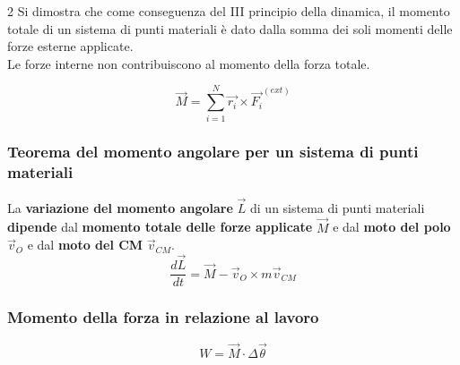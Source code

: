 \documentclass[twoside]{article}
\begin{document}
\begin{multicols}{2}
  \noindent
  Si dimostra che come conseguenza del III principio della dinamica, il momento totale di un sistema di punti materiali è dato dalla somma dei soli momenti delle forze esterne applicate.
  \columnbreak
  \noindent
  \\
  Le forze interne non contribuiscono al momento della forza totale.
\end{multicols}
\begin{equation*}
  \vec{M} = \sum_{i=1}^{N} \vec{r_i} \times \vec{F_i}^{(ext)}
\end{equation*}

\subsubsection{Teorema del momento angolare per un sistema di punti materiali}
La \textbf{variazione del momento angolare} $\vec{L}$ di un sistema di punti materiali \textbf{dipende} dal \textbf{momento totale delle forze applicate} $\vec{M}$ e dal \textbf{moto del polo} $\vec{v}_O$ e dal \textbf{moto del CM} $\vec{v}_{CM}$.
\begin{equation}
  \boxed{\frac{d\vec{L}}{dt} = \vec{M} - \vec{v}_O \times m \vec{v}_{CM}}
\end{equation}

\subsubsection{Momento della forza in relazione al lavoro}
\begin{equation*}
  W = \vec{M} \cdot \Delta \vec{\theta}
\end{equation*}
\end{document}
